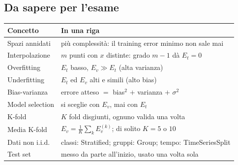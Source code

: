 \subsection{Da sapere per l'esame}
\begin{center}
    \begin{tabular}{l|l}
        \textbf{Concetto} & \textbf{In una riga} \\ \hline
        Spazi annidati   & più complessità: il training error minimo non sale mai \\ \hline
        Interpolazione   & $m$ punti con $x$ distinte: grado $m-1$ dà $E_t = 0$ \\ \hline
        Overfitting      & $E_t$ basso, $E_v \gg E_t$ (alta varianza) \\ \hline
        Underfitting     & $E_t$ ed $E_v$ alti e simili (alto bias) \\ \hline
        Bias-varianza    & errore atteso $=$ bias$^2$ $+$ varianza $+$ $\sigma^2$ \\ \hline
        Model selection  & si sceglie con $E_v$, mai con $E_t$ \\ \hline
        K-fold           & $K$ fold disgiunti, ognuno valida una volta \\ \hline
        Media K-fold     & $E_v = \frac{1}{K}\sum_{k} E_v^{(k)}$; di solito $K = 5$ o $10$ \\ \hline
        Dati non i.i.d.  & classi: Stratified; gruppi: Group; tempo: TimeSeriesSplit \\ \hline
        Test set         & messo da parte all'inizio, usato una volta sola \\
    \end{tabular}
\end{center}